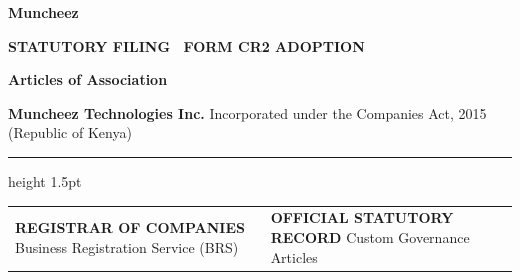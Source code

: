 \documentclass[11pt,a4paper]{article}
\begin{document}
\pagestyle{empty}
\begin{titlepage}
    \vspace*{2.5cm}
    
    {\fontsize{44}{52}\sffamily\bfseries\color{CorporateNavy} Muncheez}
    
    \vspace{0.8cm}
    
    
    \vspace{2.5cm}
    
    {\fontsize{11}{14}\sffamily\bfseries\color{LinkBlue}\uppercase{Statutory Filing \textperiodcentered\ Form CR2 Adoption}}
    
    \vspace{0.5cm}
    
    {\fontsize{28}{34}\sffamily\bfseries\color{CorporateNavy} Articles of Association}
    
    \vspace{1.0cm}
    
    {\fontsize{11}{16}\sffamily\bfseries\color{CorporateNavy} Muncheez Technologies Inc.} \newline
    {\fontsize{10}{14}\sffamily\color{SolidBlack} Incorporated under the Companies Act, 2015 (Republic of Kenya)}
    
    \vfill
    
    \color{RuleNavy}\hrule height 1.5pt
    \vspace{0.5cm}
    
    \begin{tabularx}{\textwidth}{@{} X >{\raggedleft\arraybackslash}X @{}}
        \textsf{\small\bfseries\color{CorporateNavy} REGISTRAR OF COMPANIES} \newline
        \textsf{\scriptsize\color{SolidBlack} Business Registration Service (BRS)} &
        \textsf{\small\bfseries\color{CorporateNavy} OFFICIAL STATUTORY RECORD} \newline
        \textsf{\scriptsize\color{SolidBlack} Custom Governance Articles} \\
    \end{tabularx}
\end{titlepage}
\end{document}
